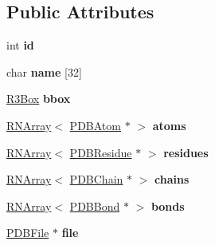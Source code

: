 \subsection*{Public Attributes}
\begin{DoxyCompactItemize}
\item 
int {\bfseries id}\hypertarget{class_p_d_b_model_a4b283a84ad8db88a8d92969e1efc0ecb}{}\label{class_p_d_b_model_a4b283a84ad8db88a8d92969e1efc0ecb}

\item 
char {\bfseries name} \mbox{[}32\mbox{]}\hypertarget{class_p_d_b_model_a1755342e70a892e72304ed9669eee835}{}\label{class_p_d_b_model_a1755342e70a892e72304ed9669eee835}

\item 
\hyperlink{class_r3_box}{R3\+Box} {\bfseries bbox}\hypertarget{class_p_d_b_model_abd019842130b742c41e12c1d5eea9264}{}\label{class_p_d_b_model_abd019842130b742c41e12c1d5eea9264}

\item 
\hyperlink{class_r_n_array}{R\+N\+Array}$<$ \hyperlink{class_p_d_b_atom}{P\+D\+B\+Atom} $\ast$ $>$ {\bfseries atoms}\hypertarget{class_p_d_b_model_aebd93c45b279095aacc3719569b530be}{}\label{class_p_d_b_model_aebd93c45b279095aacc3719569b530be}

\item 
\hyperlink{class_r_n_array}{R\+N\+Array}$<$ \hyperlink{class_p_d_b_residue}{P\+D\+B\+Residue} $\ast$ $>$ {\bfseries residues}\hypertarget{class_p_d_b_model_a0b73fd6e803cc372b3b10c2abde28f23}{}\label{class_p_d_b_model_a0b73fd6e803cc372b3b10c2abde28f23}

\item 
\hyperlink{class_r_n_array}{R\+N\+Array}$<$ \hyperlink{class_p_d_b_chain}{P\+D\+B\+Chain} $\ast$ $>$ {\bfseries chains}\hypertarget{class_p_d_b_model_a832efc5274c0053cd5a120d3d63140fd}{}\label{class_p_d_b_model_a832efc5274c0053cd5a120d3d63140fd}

\item 
\hyperlink{class_r_n_array}{R\+N\+Array}$<$ \hyperlink{class_p_d_b_bond}{P\+D\+B\+Bond} $\ast$ $>$ {\bfseries bonds}\hypertarget{class_p_d_b_model_a5915ef31994f02b1b27a4e56ef4f7615}{}\label{class_p_d_b_model_a5915ef31994f02b1b27a4e56ef4f7615}

\item 
\hyperlink{class_p_d_b_file}{P\+D\+B\+File} $\ast$ {\bfseries file}\hypertarget{class_p_d_b_model_a57bcec9ab38b77d7ff74d113060f1c40}{}\label{class_p_d_b_model_a57bcec9ab38b77d7ff74d113060f1c40}


\end{DoxyCompactItemize}
